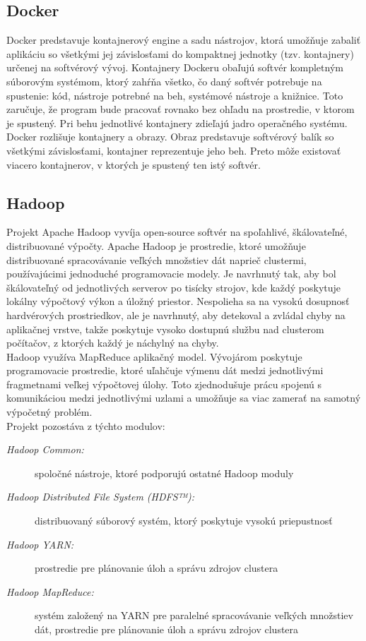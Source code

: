 \documentclass[printed,11pt,twoside,color,cover,table]{fithesis3}
\begin{document}
\subsection{Docker}
Docker predstavuje kontajnerový engine a sadu nástrojov, ktorá umožňuje zabaliť aplikáciu so všetkými jej závislosťami do kompaktnej jednotky (tzv. kontajnery) určenej na softvérový vývoj. Kontajnery Dockeru 
obaľujú softvér kompletným súborovým systémom, ktorý zahŕňa všetko, čo daný softvér potrebuje na spustenie: kód, nástroje potrebné na beh, systémové nástroje a knižnice. Toto zaručuje, že program bude pracovať rovnako bez ohľadu na prostredie, v ktorom
je spustený.\cite{docker} 
Pri behu jednotlivé kontajnery zdieľajú jadro operačného systému.
\\Docker rozlišuje kontajnery a obrazy. Obraz predstavuje softvérový balík so všetkými závislosťami, kontajner reprezentuje jeho beh. Preto môže existovať viacero kontajnerov, v ktorých je spustený ten istý
softvér.

\subsection{Hadoop}
Projekt Apache Hadoop vyvíja open-source softvér na spoľahlivé, škálovateľné, distribuované výpočty. Apache Hadoop je prostredie, ktoré umožňuje distribuované spracovávanie veľkých množstiev dát
naprieč clustermi, používajúcimi jednoduché programovacie modely. Je navrhnutý tak, aby bol škálovateľný od jednotlivých serverov po tisícky strojov, kde každý poskytuje lokálny výpočtový výkon a úložný priestor.
Nespolieha sa na vysokú dosupnosť hardvérových prostriedkov, ale je navrhnutý, aby detekoval a zvládal chyby na aplikačnej vrstve, takže poskytuje vysoko dostupnú službu nad clusterom počítačov, 
z ktorých každý je náchylný na chyby. \cite{hadoop}
\\Hadoop využíva MapReduce aplikačný model. Vývojárom poskytuje programovacie prostredie, ktoré uľahčuje výmenu dát medzi jednotlivými fragmetnami veľkej výpočtovej úlohy. Toto zjednodušuje
prácu spojenú s komunikáciou medzi jednotlivými uzlami a umožňuje sa viac zamerať na samotný výpočetný problém.
\\Projekt pozostáva z týchto modulov:
\begin{description}
\item[\emph{Hadoop Common:}] spoločné nástroje, ktoré podporujú ostatné Hadoop moduly
\item[\emph{Hadoop Distributed File System (HDFS™):}] distribuovaný súborový systém, ktorý poskytuje vysokú priepustnosť
\item[\emph{Hadoop YARN:}] prostredie pre plánovanie úloh a správu zdrojov clustera
\item[\emph{Hadoop MapReduce:}] systém založený na YARN pre paralelné spracovávanie veľkých množstiev dát, prostredie pre plánovanie úloh a správu zdrojov clustera
\end{description}
\end{document}
